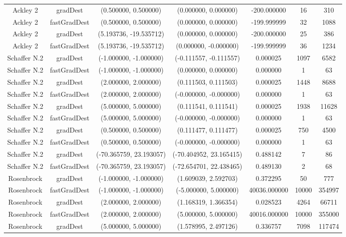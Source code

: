 \begin{longtable}{|c|c|c|c|c|c|c|}
Ackley 2 & gradDest & (0.500000, 0.500000) & (0.000000, 0.000000) & -200.000000 & 16 & 310 \\
Ackley 2 & fastGradDest & (0.500000, 0.500000) & (0.000000, 0.000000) & -199.999999 & 32 & 1088 \\
Ackley 2 & gradDest & (5.193736, -19.535712) & (0.000000, 0.000000) & -200.000000 & 25 & 386 \\
Ackley 2 & fastGradDest & (5.193736, -19.535712) & (0.000000, -0.000000) & -199.999999 & 36 & 1234 \\
Schaffer N.2 & gradDest & (-1.000000, -1.000000) & (-0.111557, -0.111557) & 0.000025 & 1097 & 6582 \\
Schaffer N.2 & fastGradDest & (-1.000000, -1.000000) & (0.000000, 0.000000) & 0.000000 & 1 & 63 \\
Schaffer N.2 & gradDest & (2.000000, 2.000000) & (0.111503, 0.111503) & 0.000025 & 1448 & 8688 \\
Schaffer N.2 & fastGradDest & (2.000000, 2.000000) & (-0.000000, -0.000000) & 0.000000 & 1 & 63 \\
Schaffer N.2 & gradDest & (5.000000, 5.000000) & (0.111541, 0.111541) & 0.000025 & 1938 & 11628 \\
Schaffer N.2 & fastGradDest & (5.000000, 5.000000) & (-0.000000, -0.000000) & 0.000000 & 1 & 63 \\
Schaffer N.2 & gradDest & (0.500000, 0.500000) & (0.111477, 0.111477) & 0.000025 & 750 & 4500 \\
Schaffer N.2 & fastGradDest & (0.500000, 0.500000) & (-0.000000, -0.000000) & 0.000000 & 1 & 63 \\
Schaffer N.2 & gradDest & (-70.365759, 23.193057) & (-70.404952, 23.165415) & 0.488142 & 7 & 86 \\
Schaffer N.2 & fastGradDest & (-70.365759, 23.193057) & (-72.654701, 22.438465) & 0.489130 & 2 & 68 \\
Rosenbrock & gradDest & (-1.000000, -1.000000) & (1.609039, 2.592703) & 0.372295 & 50 & 777 \\
Rosenbrock & fastGradDest & (-1.000000, -1.000000) & (-5.000000, 5.000000) & 40036.000000 & 10000 & 354997 \\
Rosenbrock & gradDest & (2.000000, 2.000000) & (1.168319, 1.366354) & 0.028523 & 4264 & 66711 \\
Rosenbrock & fastGradDest & (2.000000, 2.000000) & (5.000000, 5.000000) & 40016.000000 & 10000 & 355000 \\
Rosenbrock & gradDest & (5.000000, 5.000000) & (1.578995, 2.497126) & 0.336757 & 7098 & 117474 \\

\end{longtable}

